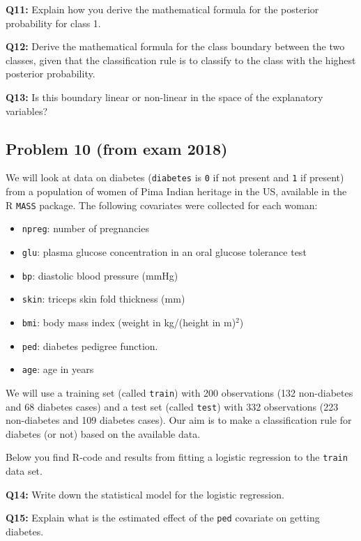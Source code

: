 \documentclass[]{article}
\providecommand{\tightlist}{%
  \setlength{\itemsep}{0pt}\setlength{\parskip}{0pt}}
\begin{document}
\textbf{Q11:} Explain how you derive the mathematical formula for the
posterior probability for class 1.

\textbf{Q12:} Derive the mathematical formula for the class boundary
between the two classes, given that the classification rule is to
classify to the class with the highest posterior probability.

\textbf{Q13:} Is this boundary linear or non-linear in the space of the
explanatory variables?

\subsection{Problem 10 (from exam
2018)}\label{problem-10-from-exam-2018}

We will look at data on diabetes (\texttt{diabetes} is \texttt{0} if not
present and \texttt{1} if present) from a population of women of Pima
Indian heritage in the US, available in the R \texttt{MASS} package. The
following covariates were collected for each woman:

\begin{itemize}
\tightlist
\item
  \texttt{npreg}: number of pregnancies
\item
  \texttt{glu}: plasma glucose concentration in an oral glucose
  tolerance test
\item
  \texttt{bp}: diastolic blood pressure (mmHg)
\item
  \texttt{skin}: triceps skin fold thickness (mm)
\item
  \texttt{bmi}: body mass index (weight in kg/(height in m)\(^2\))
\item
  \texttt{ped}: diabetes pedigree function.
\item
  \texttt{age}: age in years
\end{itemize}

We will use a training set (called \texttt{train}) with 200 observations
(132 non-diabetes and 68 diabetes cases) and a test set (called
\texttt{test}) with 332 observations (223 non-diabetes and 109 diabetes
cases). Our aim is to make a classification rule for diabetes (or not)
based on the available data.

Below you find R-code and results from fitting a logistic regression to
the \texttt{train} data set.

\textbf{Q14:} Write down the statistical model for the logistic
regression.

\textbf{Q15:} Explain what is the estimated effect of the \texttt{ped}
covariate on getting diabetes.
\end{document}
